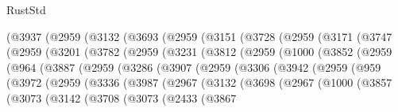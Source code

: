 \begin{lexlean}{RustStd}
\begin{coremodule}
      (@3937
        (@2959
          (@3132
            (@3693
              (@2959
                (@3151
                  (@3728
                    (@2959
                      (@3171
                        (@3747
                          (@2959
                            (@3201
                              (@3782
                                (@2959
                                  (@3231
                                    (@3812
                                      (@2959
                                        (@1000
                                          (@3852
                                            (@2959
                                              (@964
                                                (@3887
                                                  (@2959
                                                    (@3286
                                                      (@3907
                                                        (@2959
                                                          (@3306
                                                            (@3942
                                                              (@2959
                                                                (@959
                                                                  (@3972
                                                                    (@2959
                                                                      (@3336
                                                                        (@3987
                                                                          (@2967
                                                                            (@3132
                                                                              (@3698
                                                                                (@2967
                                                                                  (@1000
                                                                                    (@3857
                                                                                      (@3073
                                                                                        (@3142
                                                                                          (@3708
                                                                                            (@3073
                                                                                              (@2433
                                                                                                (@3867

\end{coremodule}
\end{lexlean}
